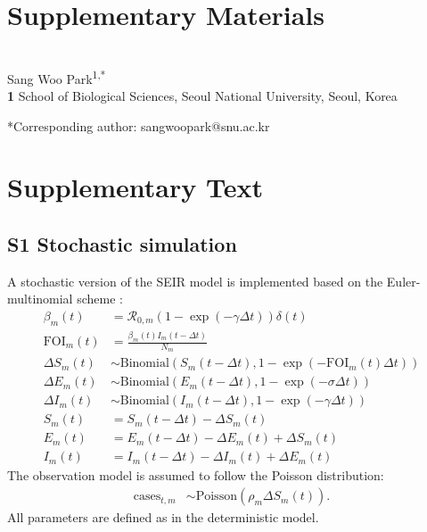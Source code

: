 \documentclass[12pt]{article}
\date{\today}
\begin{document}
\section*{Supplementary Materials}

\begin{flushleft}{
	\Large
	\textbf{}
}
\newline
\\
Sang Woo Park\textsuperscript{1,*}
\\
\bigskip
\textbf{1} School of Biological Sciences, Seoul National University, Seoul, Korea
\bigskip

*Corresponding author: sangwoopark@snu.ac.kr
\end{flushleft}

\section*{Supplementary Text}

\subsection*{S1 Stochastic simulation}

A stochastic version of the SEIR model is implemented based on the Euler-multinomial scheme \citep{king2016statistical}:
\begin{align}
\beta_m (t) &= \mathcal R_{0,m} (1-\exp(-\gamma\Delta t)) \delta(t)\\
\textrm{FOI}_m(t) &= \frac{\beta_m (t) I_m(t-\Delta t)}{N_m}\\
\Delta S_m(t) &\sim \mathrm{Binomial}\left(S_m(t-\Delta t), 1- \exp(-\textrm{FOI}_m(t) \Delta t)\right) \\
\Delta E_m(t) &\sim \mathrm{Binomial}\left(E_m(t-\Delta t), 1- \exp(-\sigma \Delta t)\right)\\
\Delta I_m(t) &\sim \mathrm{Binomial}\left(I_m(t-\Delta t), 1- \exp(-\gamma \Delta t)\right)\\
S_m(t) &= S_m(t-\Delta t) -\Delta S_m(t)\\
E_m(t) &= E_m(t-\Delta t) -\Delta E_m(t) + \Delta S_m(t)\\
I_m(t) &= I_m(t-\Delta t) -\Delta I_m(t) + \Delta E_m(t)
\end{align}
The observation model is assumed to follow the Poisson distribution: 
\begin{align}
\mathrm{cases}_{t,m} &\sim \mathrm{Poisson}(\rho_m \Delta S_m(t)).
\end{align}
All parameters are defined as in the deterministic model.
\end{document}

